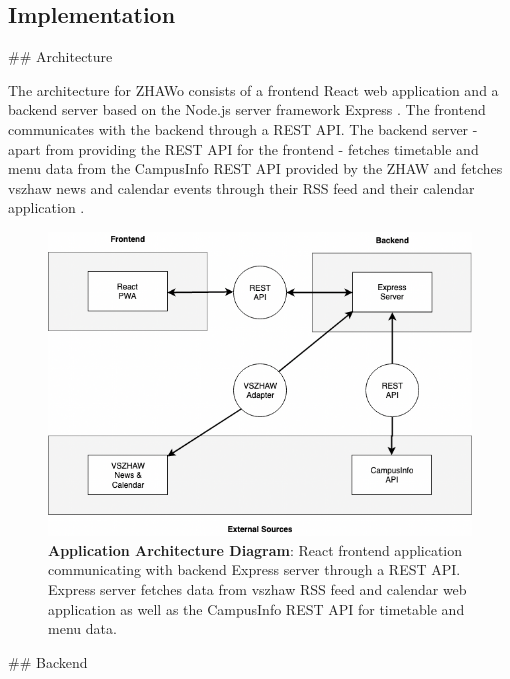 \begin{markdown}
\section{Implementation} \label{implementation}

## Architecture

The architecture for ZHAWo consists of a frontend React \cite{React} web application and a backend server based on the Node.js \cite{Node} server framework Express \cite{Express}. The frontend communicates with the backend through a REST API. The backend server - apart from providing the REST API for the frontend - fetches timetable and menu data from the CampusInfo REST API provided by the ZHAW and fetches vszhaw news and calendar events through their RSS feed \cite{VszhawNews} and their calendar application \cite{VszhawCalendar}.

\bigskip
\bigskip

\begin{figure}[H]
  \includegraphics[width=14cm, center]{../../diagrams/applicationArchitecture.png}
  \captionsetup{width=13.5cm}
  \caption[Application Architecture Diagram]{\textbf{Application Architecture Diagram}: React frontend application communicating with backend Express server through a REST API. Express server fetches data from vszhaw RSS feed and calendar web application as well as the CampusInfo REST API for timetable and menu data.}
\end{figure}

\newpage

## Backend


\end{markdown}
